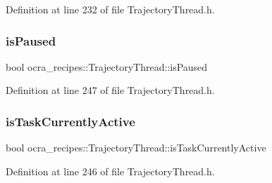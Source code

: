 Definition at line 232 of file Trajectory\+Thread.\+h.

\hypertarget{classocra__recipes_1_1TrajectoryThread_a08dc8a4a78b61d6b3d1e38e82b809493}{}\label{classocra__recipes_1_1TrajectoryThread_a08dc8a4a78b61d6b3d1e38e82b809493} 
\subsubsection{\texorpdfstring{is\+Paused}{isPaused}}
{\footnotesize\ttfamily bool ocra\+\_\+recipes\+::\+Trajectory\+Thread\+::is\+Paused\hspace{0.3cm}{\ttfamily [protected]}}



Definition at line 247 of file Trajectory\+Thread.\+h.

\hypertarget{classocra__recipes_1_1TrajectoryThread_a7f185a5b52a00b7e5bce78e5ffb77d97}{}\label{classocra__recipes_1_1TrajectoryThread_a7f185a5b52a00b7e5bce78e5ffb77d97} 
\subsubsection{\texorpdfstring{is\+Task\+Currently\+Active}{isTaskCurrentlyActive}}
{\footnotesize\ttfamily bool ocra\+\_\+recipes\+::\+Trajectory\+Thread\+::is\+Task\+Currently\+Active\hspace{0.3cm}{\ttfamily [protected]}}



Definition at line 246 of file Trajectory\+Thread.\+h.

\hypertarget{classocra__recipes_1_1TrajectoryThread_adb4b6cffdd2a797c95b54642e13502d2}{}\label{classocra__recipes_1_1TrajectoryThread_adb4b6cffdd2a797c95b54642e13502d2} 
